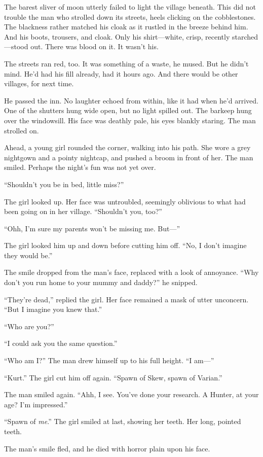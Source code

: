 
The barest sliver of moon utterly failed to light the village beneath.
This did not trouble the man who strolled down its streets, heels clicking on the cobblestones.
The blackness rather matched his cloak as it rustled in the breeze behind him.
And his boots, trousers, and cloak.
Only his shirt---white, crisp, recently starched---stood out.
There was blood on it.
It wasn't his.


The streets ran red, too.
It was something of a waste, he mused.
But he didn't mind.
He'd had his fill already, had it hours ago.
And there would be other villages, for next time.

He passed the inn.
No laughter echoed from within, like it had when he'd arrived.
One of the shutters hung wide open, but no light spilled out.
The barkeep hung over the windowsill.
His face was deathly pale, his eyes blankly staring.
The man strolled on.

Ahead, a young girl rounded the corner, walking into his path.
She wore a grey nightgown and a pointy nightcap, and pushed a broom in front of her.
The man smiled.
Perhaps the night's fun was not yet over.

``Shouldn't you be in bed, little miss?''

The girl looked up.
Her face was untroubled, seemingly oblivious to what had been going on in her village.
``Shouldn't you, too?''

``Ohh, I'm sure my parents won't be missing me.
But---''

The girl looked him up and down before cutting him off.
``No, I don't imagine they would be.''

The smile dropped from the man's face, replaced with a look of annoyance.
``Why don't you run home to your mummy and daddy?'' he snipped.

``They're dead,'' replied the girl.
Her face remained a mask of utter unconcern.
``But I imagine you knew that.''

``Who are you?''

``I could ask you the same question.''

``Who am I?''
The man drew himself up to his full height.
``I am---''

``Kurt.''
The girl cut him off again.
``Spawn of Skew, spawn of Varian.''

The man smiled again.
``Ahh, I see.
You've done your research.
A Hunter, at your age?
I'm impressed.''

``Spawn of \emph{me}.''
The girl smiled at last, showing her teeth.
Her long, pointed teeth.

The man's smile fled, and he died with horror plain upon his face.
